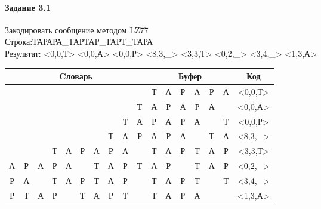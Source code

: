 \documentclass[a4paper, 12pt]{article}
\begin{document}
\paragraph{Задание 3.1}

Закодировать сообщение методом LZ77\\
Строка:ТАРАРА\_ТАРТАР\_ТАРТ\_ТАРА\\
Результат: <0,0,Т> <0,0,А> <0,0,Р> <8,3,\_> <3,3,Т> <0,2,\_> <3,4,\_> <1,3,А>\\
\begin{table}[h!]
\centering
\begin{tabular}{|c|c|c|c|c|c|c|c|c|c|c|c|c|c|c|c|c|} 
\hline
\multicolumn{10}{|c|}{Cловарь} & \multicolumn{6}{c|}{Буфер} & Код  \\ \hline
  &   &   &   &   &   &   &   &   &   & \cellcolor[HTML]{8CE4F6} Т & А & Р & А & Р & А & <0,0,Т>
\\ \hline
  &   &   &   &   &   &   &   &   & Т & \cellcolor[HTML]{8CE4F6} А & Р & А & Р & А &   & <0,0,А>
\\ \hline
  &   &   &   &   &   &   &   & Т & А & \cellcolor[HTML]{8CE4F6} Р & А & Р & А &   & Т & <0,0,Р>
\\ \hline
  &   &   &   &   &   &   & Т & \cellcolor[HTML]{FFFF00} А & \cellcolor[HTML]{FFFF00} Р & \cellcolor[HTML]{FFFF00} А & \cellcolor[HTML]{FFFF00} Р & \cellcolor[HTML]{FFFF00} А & \cellcolor[HTML]{8CE4F6}   & Т & А & <8,3,\_>
\\ \hline
  &   &   & \cellcolor[HTML]{FFFF00} Т & \cellcolor[HTML]{FFFF00} А & \cellcolor[HTML]{FFFF00} Р & А & Р & А &   & \cellcolor[HTML]{FFFF00} Т & \cellcolor[HTML]{FFFF00} А & \cellcolor[HTML]{FFFF00} Р & \cellcolor[HTML]{8CE4F6} Т & А & Р & <3,3,Т>
\\ \hline
\cellcolor[HTML]{FFFF00} А & \cellcolor[HTML]{FFFF00} Р & А & Р & А &   & Т & А & Р & Т & \cellcolor[HTML]{FFFF00} А & \cellcolor[HTML]{FFFF00} Р & \cellcolor[HTML]{8CE4F6}   & Т & А & Р & <0,2,\_>
\\ \hline
Р & А &   & \cellcolor[HTML]{FFFF00} Т & \cellcolor[HTML]{FFFF00} А & \cellcolor[HTML]{FFFF00} Р & \cellcolor[HTML]{FFFF00} Т & А & Р &   & \cellcolor[HTML]{FFFF00} Т & \cellcolor[HTML]{FFFF00} А & \cellcolor[HTML]{FFFF00} Р & \cellcolor[HTML]{FFFF00} Т & \cellcolor[HTML]{8CE4F6}   & Т & <3,4,\_>
\\ \hline
Р & \cellcolor[HTML]{FFFF00} Т & \cellcolor[HTML]{FFFF00} А & \cellcolor[HTML]{FFFF00} Р &   & Т & А & Р & Т &   & \cellcolor[HTML]{FFFF00} Т & \cellcolor[HTML]{FFFF00} А & \cellcolor[HTML]{FFFF00} Р & \cellcolor[HTML]{8CE4F6} А &   &   & <1,3,А>
\\ \hline
\end{tabular}
\end{table}
\end{document}
